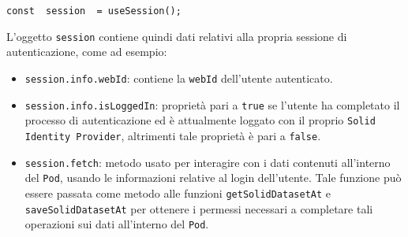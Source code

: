 {\tt const { session } = useSession();}

\bigskip

L'oggetto {\tt session} contiene quindi dati relativi alla propria sessione di autenticazione, come ad esempio:

\begin{itemize}
	\item {\tt session.info.webId}: contiene la {\tt webId} dell'utente autenticato.
	\item {\tt session.info.isLoggedIn}: proprietà pari a {\tt true} se l'utente ha completato il processo di autenticazione ed è attualmente loggato con il proprio {\tt Solid Identity Provider}, altrimenti tale proprietà è pari a {\tt false}.
	\item {\tt session.fetch}: metodo usato per interagire con i dati contenuti all'interno del {\tt Pod}, usando le informazioni relative al login dell'utente. Tale funzione può essere passata come metodo alle funzioni {\tt getSolidDatasetAt} e {\tt saveSolidDatasetAt} per ottenere i permessi necessari a completare tali operazioni sui dati all'interno del {\tt Pod}.
\end{itemize}

\clearpage
